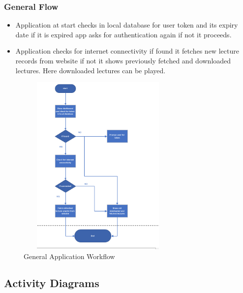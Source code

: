 \documentclass[12pt]{article}
\begin{document}
\newpage
\subsubsection{General Flow}
\begin{itemize}
\item Application at start checks in local database for user token and its expiry date if it is expired app asks for authentication again if not it proceeds.
\item Application checks for internet connectivity if found it fetches new lecture records from website if not it shows previously fetched and downloaded lectures. Here downloaded lectures can be played.
\end{itemize}

\begin{figure}[h]
\begin{center}
\includegraphics[width=8cm, height=9cm]{applicationworkflow}
\caption{General Application Workflow}
\end{center}
\end{figure}

\newpage
\subsection{Activity Diagrams}
\end{document}
